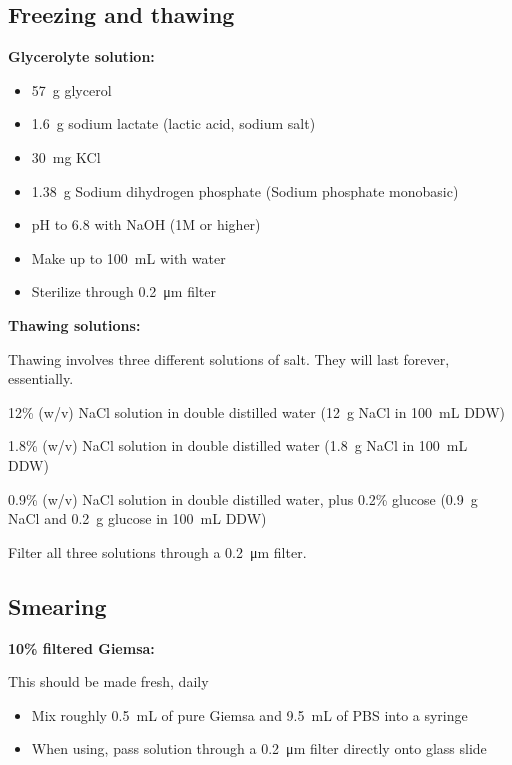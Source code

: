 \documentclass{article}
\begin{document}
\subsection{Freezing and thawing}

\textbf{Glycerolyte solution:}

\begin{itemize}
	\item \SI{57}{\gram} glycerol
	\item \SI{1.6}{\gram} sodium lactate (lactic acid, sodium salt)
	\item \SI{30}{\milli\gram} KCl
	\item \SI{1.38}{\gram} Sodium dihydrogen phosphate (Sodium phosphate monobasic)
	\item pH to 6.8 with NaOH (1M or higher)
	\item Make up to \SI{100}{mL} with water
	\item Sterilize through \SI{0.2}{\micro\meter} filter
\end{itemize}

\textbf{Thawing solutions:}

Thawing involves three different solutions of salt. They will last forever, essentially.

\begin{description}
	\item[Thaw 1 - ] 12\% (w/v) NaCl solution in double distilled water (\SI{12}{g} NaCl in \SI{100}{mL} DDW)
	\item[Thaw 2 - ] 1.8\% (w/v) NaCl solution in double distilled water (\SI{1.8}{g} NaCl in \SI{100}{mL} DDW)
	\item[Thaw 3 - ] 0.9\% (w/v) NaCl solution in double distilled water, plus 0.2\% glucose (\SI{0.9}{g} NaCl and \SI{0.2}{g} glucose in \SI{100}{mL} DDW)
	\item Filter all three solutions through a \SI{0.2}{\micro\meter} filter.\\
\end{description}

\subsection{Smearing}

\textbf{10\% filtered Giemsa:}

This should be made fresh, daily

\begin{itemize}
	\item Mix roughly \SI{0.5}{mL} of pure Giemsa and \SI{9.5}{mL} of PBS into a syringe
	\item When using, pass solution through a \SI{0.2}{\micro\meter} filter directly onto glass slide
\end{itemize}
\end{document}
